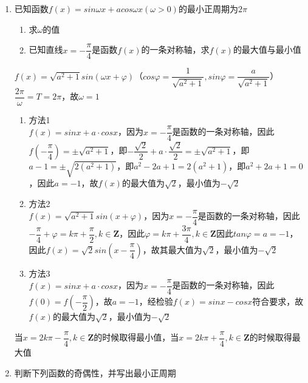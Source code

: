 \begin{enumerate}
    \item 已知函数$f(x) = sin\omega x+acos\omega x (\omega > 0)$的最小正周期为$2\pi$
    \begin{enumerate}
        \item 求$\omega$的值
        \item 已知直线$x = -\dfrac{\pi}{4}$是函数$f(x)$的一条对称轴，求$f(x)$的最大值与最小值
    \end{enumerate}
    \begin{jieda}
        $f(x) = \sqrt{a^2+1}sin(\omega x + \varphi)$（$cos\varphi = \dfrac{1}{\sqrt{a^2+1}}, sin\varphi = \dfrac{a}{\sqrt{a^2+1}}$）$\dfrac{2\pi}{\omega} = T = 2\pi$，故$\omega = 1$
        \begin{enumerate}
            \item 方法1 \\
             $f(x) = sinx + a \cdot cosx$，因为$x = -\dfrac{\pi}{4}$是函数的一条对称轴，因此$f\left(-\dfrac{\pi}{4}\right) = \pm \sqrt{a^2+1}$，即$-\dfrac{\sqrt{2}}{2} + a \cdot \dfrac{\sqrt{2}}{2} = \pm \sqrt{a^2+1}$，即$a-1 = \pm \sqrt{2(a^2+1)}$，即$a^2-2a+1 = 2(a^2+1)$，即$a^2+2a+1 = 0$，因此$a = -1$，故$f(x)$的最大值为$\sqrt{2}$，最小值为$-\sqrt{2}$
            \item 方法2 \\
            $f(x) = \sqrt{a^2+1} sin(x+\varphi)$，因为$x = -\dfrac{\pi}{4}$是函数的一条对称轴，因此$-\dfrac{\pi}{4} + \varphi = k\pi + \dfrac{\pi}{2}, k \in \mathbf{Z}$，因此$\varphi = k\pi + \dfrac{3\pi}{4}, k \in \mathbf{Z}$因此$tan\varphi = a = -1$，因此$f(x) = \sqrt{2}sin(x - \dfrac{\pi}{4})$，故其最大值为$\sqrt{2}$，最小值为$-\sqrt{2}$
            \item 方法3 \\
            $f(x) = sinx + a \cdot cosx$，因为$x = -\dfrac{\pi}{4}$是函数的一条对称轴，因此$f(0) = f(-\dfrac{\pi}{2})$，故$a = -1$，经检验$f(x) = sinx - cosx$符合要求，故$f(x)$的最大值为$\sqrt{2}$，最小值为$-\sqrt{2}$
        \end{enumerate}
        当$x = 2k\pi - \dfrac{\pi}{4}, k \in \mathbf{Z}$的时候取得最小值，当$x = 2k\pi + \dfrac{\pi}{4}, k \in \mathbf{Z}$的时候取得最大值
    \end{jieda}
    
    \item 判断下列函数的奇偶性，并写出最小正周期



\end{enumerate}
